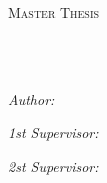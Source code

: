 \documentclass[
12pt, %
oneside, %
english, %
onehalfspacing, %
nolistspacing, %
parskip, %
headsepline, %
]{MastersDoctoralThesis} %
\author{Galina \textsc{Ryazanskaya}} %
\begin{document}
\frontmatter %

\pagestyle{plain} %


\begin{titlepage}


\begin{center}
\vspace*{.03\textheight}
{\scshape\LARGE \univname\par}\vspace{1.1cm} %
\textsc{\Large Master Thesis}\\[0.5cm] %

\HRule \\[0.4cm] %
{\huge \bfseries \ttitle\par}\vspace{0.4cm} %
\HRule \\[1.5cm] %
 
\begin{minipage}[t]{0.4\textwidth}
	\begin{flushleft} \large
	\emph{Author:}\\
	{\authorname} %
	\end{flushleft}
\end{minipage}
\begin{minipage}[t]{0.4\textwidth}
	\begin{flushright} \large
		\emph{1st Supervisor:} \\
		{\supname} %
	\end{flushright}
	\begin{flushright} \large
		\emph{2st Supervisor:} \\
		{\examname} %
	\end{flushright}
\end{minipage}\\[2cm]
 

\end{center}
\end{titlepage}
\end{document}
